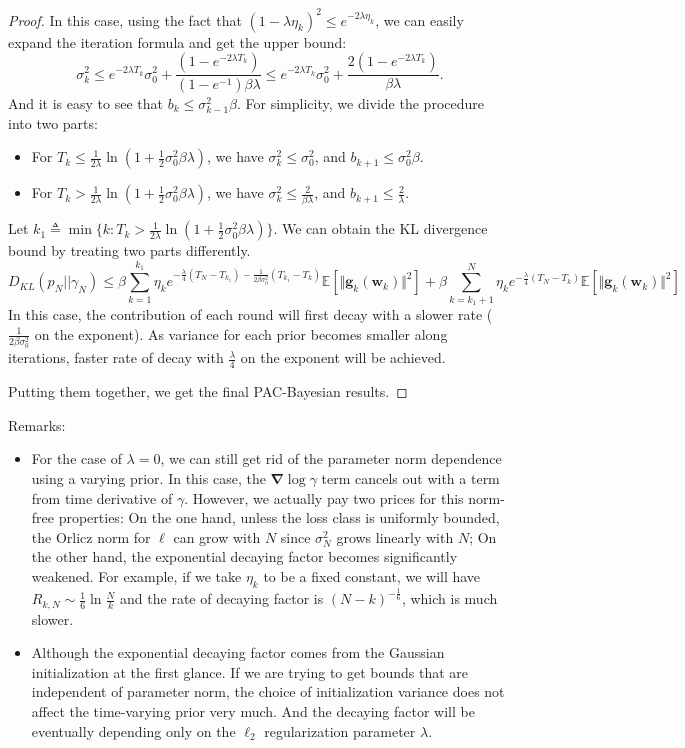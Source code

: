 \documentclass[final,12pt]{colt2018} %
\begin{document}
\begin{proof}
In this case, using the fact that $(1-\lambda\eta_k)^2\leq e^{-2\lambda\eta_k}$, we can easily expand the iteration formula and get the upper bound:
$$\sigma_k^2\leq e^{-2 \lambda T_k}\sigma_0^2+\frac{(1-e^{-2\lambda T_k})}{(1-e^{-1}) \beta \lambda}\leq e^{-2 \lambda T_k}\sigma_0^2+\frac{2(1-e^{-2\lambda T_k})}{ \beta \lambda}.$$ 
And it is easy to see that $b_k\leq \sigma_{k-1}^2\beta$. For simplicity, we divide the procedure into two parts:
\begin{itemize}
  \item For $T_k\leq \frac{1}{2 \lambda}\ln (1+\frac{1}{2}\sigma_0^2\beta \lambda)$, we have $\sigma_k^2\leq \sigma_0^2$, and $b_{k+1}\leq \sigma_0^2\beta$.
  \item For $T_k> \frac{1}{2 \lambda}\ln (1+\frac{1}{2}\sigma_0^2\beta \lambda)$, we have $\sigma_k^2\leq \frac{2}{\beta \lambda}$, and $b_{k+1}\leq \frac{2}{\lambda}$.
\end{itemize}
Let $k_1\triangleq \min\{k:T_k>\frac{1}{2 \lambda}\ln (1+\frac{1}{2}\sigma_0^2\beta \lambda)\}$. We can obtain the KL divergence bound by treating two parts differently.
\begin{equation}
  D_{KL}(p_N||\gamma_N)\leq \beta\sum_{k=1}^{k_1} \eta_k e^{-\frac{\lambda}{4}(T_N-T_{k_1})-\frac{1}{2 \beta \sigma_0^2}(T_{k_1}-T_k)}\mathbb{E}\left[\Vert\bm{g}_k(\bm{w}_k)\Vert^2\right]+\beta\sum_{k=k_1+1}^{N} \eta_k e^{-\frac{\lambda}{4}(T_N-T_k)}\mathbb{E}\left[\Vert\bm{g}_k(\bm{w}_k)\Vert^2\right]
\end{equation}
In this case, the contribution of each round will first decay with a slower rate ($\frac{1}{2 \beta \sigma_0^2}$ on the exponent). As variance for each prior becomes smaller along iterations, faster rate of decay with $\frac{\lambda}{4}$ on the exponent will be achieved.

Putting them together, we get the final PAC-Bayesian results.
\end{proof}
Remarks:
\begin{itemize}
  \item For the case of $\lambda=0$, we can still get rid of the parameter norm dependence using a varying prior. In this case, the $\bm{\nabla}\log \gamma$ term cancels out with a term from time derivative of $\gamma$. However, we actually pay two prices for this norm-free properties: On the one hand, unless the loss class is uniformly bounded, the Orlicz norm for $\ell$ can grow with $N$ since $\sigma_N^2$ grows linearly with $N$; On the other hand, the exponential decaying factor becomes significantly weakened. For example, if we take $\eta_k$ to be a fixed constant, we will have $R_{k,N}\sim \frac{1}{6}\ln \frac{N}{k}$ and the rate of decaying factor is $(N-k)^{-\frac{1}{6}}$, which is much slower.
  \item Although the exponential decaying factor comes from the Gaussian initialization at the first glance. If we are trying to get bounds that are independent of parameter norm, the choice of initialization variance does not affect the time-varying prior very much. And the decaying factor will be eventually depending only on the $\ell_2$ regularization parameter $\lambda$.
\end{itemize}
\end{document}
